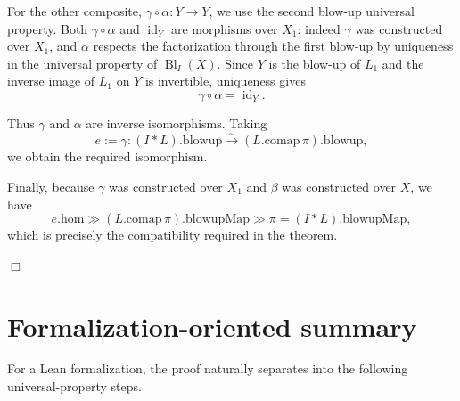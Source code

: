 \documentclass[11pt]{article}
\newcommand{\Bl}{\operatorname{Bl}}
\begin{document}
For the other composite, \(\gamma\circ\alpha:Y\to Y\), we use the second
blow-up universal property.  Both \(\gamma\circ\alpha\) and
\(\operatorname{id}_Y\) are morphisms over \(X_1\): indeed \(\gamma\) was
constructed over \(X_1\), and \(\alpha\) respects the factorization through
the first blow-up by uniqueness in the universal property of
\(\Bl_I(X)\).  Since \(Y\) is the blow-up of \(L_1\) and the inverse image
of \(L_1\) on \(Y\) is invertible, uniqueness gives
\[
  \gamma\circ\alpha=\operatorname{id}_Y.
\]

Thus \(\gamma\) and \(\alpha\) are inverse isomorphisms.  Taking
\[
  e:=\gamma:
  (I*L).\mathrm{blowup}
  \xrightarrow{\sim}
  (L.\mathrm{comap}\,\pi).\mathrm{blowup},
\]
we obtain the required isomorphism.

Finally, because \(\gamma\) was constructed over \(X_1\) and
\(\beta\) was constructed over \(X\), we have
\[
  e.\mathrm{hom}
  \gg
  (L.\mathrm{comap}\,\pi).\mathrm{blowupMap}
  \gg
  \pi
  =
  (I*L).\mathrm{blowupMap},
\]
which is precisely the compatibility required in the theorem.

\hfill\(\Box\)

\section*{Formalization-oriented summary}

For a Lean formalization, the proof naturally separates into the following
universal-property steps.
\end{document}
